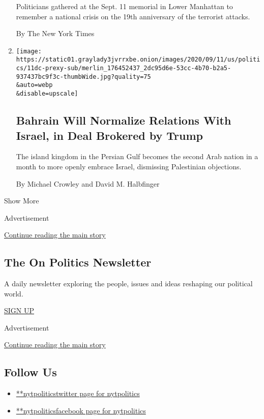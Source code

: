 \begin{enumerate}
  Politicians gathered at the Sept. 11 memorial in Lower Manhattan to
  remember a national crisis on the 19th anniversary of the terrorist
  attacks.

  By The New York Times
\item
  \href{/2020/09/11/world/middleeast/bahrain-israel-trump.html}{}

  \texttt{[image: https://static01.graylady3jvrrxbe.onion/images/2020/09/11/us/politics/11dc-prexy-sub/merlin\_176452437\_2dc95d6e-53cc-4b70-b2a5-937437bc9f3c-thumbWide.jpg?quality=75\\\&auto=webp\\\&disable=upscale]}

  \hypertarget{bahrain-will-normalize-relations-with-israel-in-deal-brokered-by-trump}{%
  \subsection{Bahrain Will Normalize Relations With Israel, in Deal
  Brokered by
  Trump}\label{bahrain-will-normalize-relations-with-israel-in-deal-brokered-by-trump}}

  The island kingdom in the Persian Gulf becomes the second Arab nation
  in a month to more openly embrace Israel, dismissing Palestinian
  objections.

  By Michael Crowley and David M. Halbfinger
\end{enumerate}

Show More

Advertisement

\protect\hyperlink{after-mid2}{Continue reading the main story}

\hypertarget{the-on-politics-newsletter}{%
\subsection{The On Politics
Newsletter}\label{the-on-politics-newsletter}}

A daily newsletter exploring the people, issues and ideas reshaping our
political world.

\href{/newsletters/signup/CN}{SIGN UP}

Advertisement

\protect\hyperlink{after-mktg}{Continue reading the main story}

\hypertarget{follow-us}{%
\subsection{Follow Us}\label{follow-us}}

\begin{itemize}
\tightlist
\item
  \href{https://twitter.com/nytpolitics}{**nytpoliticstwitter page for
  nytpolitics}
\item
  \href{https://www.facebookcorewwwi.onion/nytpolitics}{**nytpoliticsfacebook
  page for nytpolitics}
\end{itemize}

